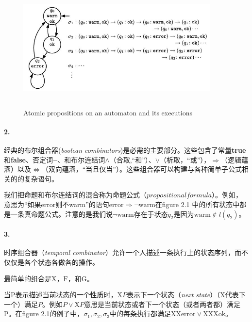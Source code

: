 \documentclass{book}
\begin{document}
    \begin{figure}
        \centering
        \includegraphics[height=2.5in,width=4.0in]{2_1.jpg}
        \caption{Atomic propositions on an automaton and its executions}
    \end{figure}

    \paragraph{2.} 经典的布尔组合器({\itshape boolean combinators})是必需的主要部分。这些包含了常量\textbf{true}和\textbf{false}、否定词$\neg$、和布尔连结词$\wedge$（合取,“和”）、$\vee$（析取，“或”），$\Rightarrow$（逻辑蕴涵）以及$\Leftrightarrow$（双向蕴涵，“当且仅当”）。这些组合器可以构建与各种简单子公式相关的的复杂语句。

    我们把命题和布尔连结词的混合称为命题公式（$propositional formula$）。例如，意思为“如果error则不warm”的语句$\text{error} \Rightarrow \neg \text{warm}$在figure 2.1 中的所有状态中都是一条真命题公式。注意的是我们说$\neg \text{warm}$存在于状态$q_2$是因为$\text{warm} \notin l(q_2)$。

    \paragraph{3.}时序组合器（{\itshape temporal combinator}）允许一个人描述一条执行上的状态序列，而不仅仅是各个状态各做各的操作。

    最简单的组合是$\mathrm{X}$，$\mathrm{F}$，和$\mathrm{G}$。

    当P表示描述当前状态的一个性质时，$\mathrm{X}P$表示下一个状态（{\itshape next state}）（$\mathrm{X}$代表下一个）满足$P$。例如$P \vee \mathrm{X}P$意思是当前状态或者下一个状态（或者两者都）满足P。在figure 2.1的例子中，$\sigma_1, \sigma_2, \sigma_3$中的每条执行都满足$\mathrm{X}\mathrm{X}\text{error} \vee \mathrm{X}\mathrm{X}\mathrm{X} \text{ok}$。
\end{document}
